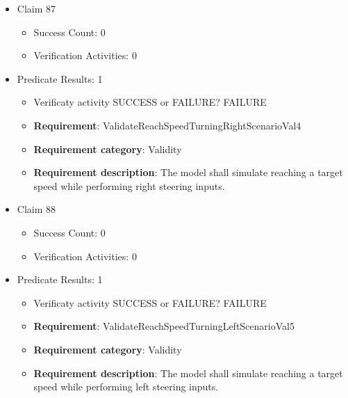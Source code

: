 \documentclass{article}
\begin{document}
\begin{itemize}
\begin{itemize}
					\item \textbf{Requirement}: ValidateReachSpeedScenarioVal3 
					\item \textbf{Requirement category}: Validity
					\item \textbf{Requirement description}: The model shall reproduce vehicle behavior when accelerating to a specified target speed under normal conditions.
					\end{itemize}

  				  \item Claim 87
				\begin{itemize}
			    	\item Success Count: 0 
			    	\item Verification Activities: 0
				\end{itemize}
				
									    
				\item Predicate Results: 1
					\begin{itemize}				
					\item Verificaty activity SUCCESS or FAILURE? FAILURE
					
					\item \textbf{Requirement}: ValidateReachSpeedTurningRightScenarioVal4 
					\item \textbf{Requirement category}: Validity
					\item \textbf{Requirement description}: The model shall simulate reaching a target speed while performing right steering inputs.
					\end{itemize}

  				  \item Claim 88
				\begin{itemize}
			    	\item Success Count: 0 
			    	\item Verification Activities: 0
				\end{itemize}
				
									    
				\item Predicate Results: 1
					\begin{itemize}				
					\item Verificaty activity SUCCESS or FAILURE? FAILURE
					
					\item \textbf{Requirement}: ValidateReachSpeedTurningLeftScenarioVal5 
					\item \textbf{Requirement category}: Validity
					\item \textbf{Requirement description}: The model shall simulate reaching a target speed while performing left steering inputs.
					\end{itemize}


\end{itemize}
\end{document}
